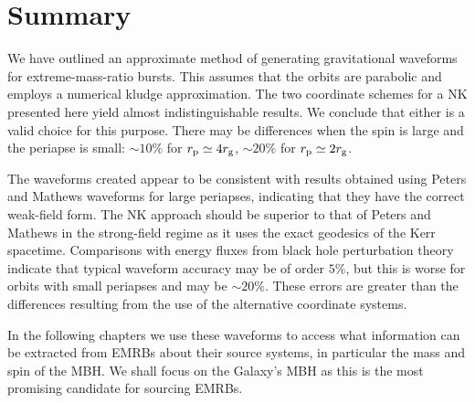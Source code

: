 \section{Summary}

We have outlined an approximate method of generating gravitational waveforms for extreme-mass-ratio bursts. This assumes that the orbits are parabolic and employs a numerical kludge approximation. The two coordinate schemes for a NK presented here yield almost indistinguishable results. We conclude that either is a valid choice for this purpose. There may be differences when the spin is large and the periapse is small: $\sim 10\%$ for $r_\mathrm{p} \simeq 4 r_\mathrm{g}$, $\sim 20\%$ for $r_\mathrm{p} \simeq 2 r_\mathrm{g}$.

The waveforms created appear to be consistent with results obtained using Peters and Mathews waveforms for large periapses, indicating that they have the correct weak-field form. The NK approach should be superior to that of Peters and Mathews in the strong-field regime as it uses the exact geodesics of the Kerr spacetime. Comparisons with energy fluxes from black hole perturbation theory indicate that typical waveform accuracy may be of order $5\%$, but this is worse for orbits with small periapses and may be $\sim 20\%$. These errors are greater than the differences resulting from the use of the alternative coordinate systems.

In the following chapters we use these waveforms to access what information can be extracted from EMRBs about their source systems, in particular the mass and spin of the MBH. We shall focus on the Galaxy's MBH as this is the most promising candidate for sourcing EMRBs.

